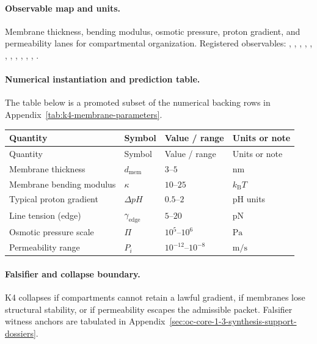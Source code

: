 \paragraph{Observable map and units.}
Membrane thickness, bending modulus, osmotic pressure, proton gradient, and permeability lanes for compartmental organization.
Registered observables: , \allowbreak {}, \allowbreak {}, \allowbreak {}, \allowbreak {}, \allowbreak {}, \allowbreak {}, \allowbreak {}, \allowbreak {}, \allowbreak {}, \allowbreak {}, \allowbreak {}.

\paragraph{Numerical instantiation and prediction table.}
The table below is a promoted subset of the numerical backing rows in Appendix~\ref{tab:k4-membrane-parameters}.
\begin{longtable}{@{}L{0.27\textwidth}L{0.15\textwidth}L{0.24\textwidth}L{0.16\textwidth}@{}}
\toprule
Quantity & Symbol & Value / range & Units or note \\
\midrule
\endfirsthead
\toprule
Quantity & Symbol & Value / range & Units or note \\
\midrule
\endhead
Membrane thickness & $\scriptstyle d_{\mathrm{mem}}$ & $3\text{--}5$ & $\mathrm{nm}$ \\
Membrane bending modulus & $\scriptstyle \kappa$ & $10\text{--}25$ & $k_{\mathrm{B}}T$ \\
Typical proton gradient & $\scriptstyle \Delta pH$ & $0.5\text{--}2$ & pH units \\
Line tension (edge) & $\scriptstyle \gamma_{\mathrm{edge}}$ & $5\text{--}20$ & $\mathrm{pN}$ \\
Osmotic pressure scale & $\scriptstyle \Pi$ & $10^5\text{--}10^6$ & $\mathrm{Pa}$ \\
Permeability range & $\scriptstyle P_i$ & $10^{-12}\text{--}10^{-8}$ & $\mathrm{m/s}$ \\
\bottomrule
\end{longtable}

\paragraph{Falsifier and collapse boundary.}
K4 collapses if compartments cannot retain a lawful gradient, if membranes lose structural stability, or if permeability escapes the admissible packet.
Falsifier witness anchors are tabulated in Appendix~\ref{sec:oc-core-1-3-synthesis-support-dossiers}.

